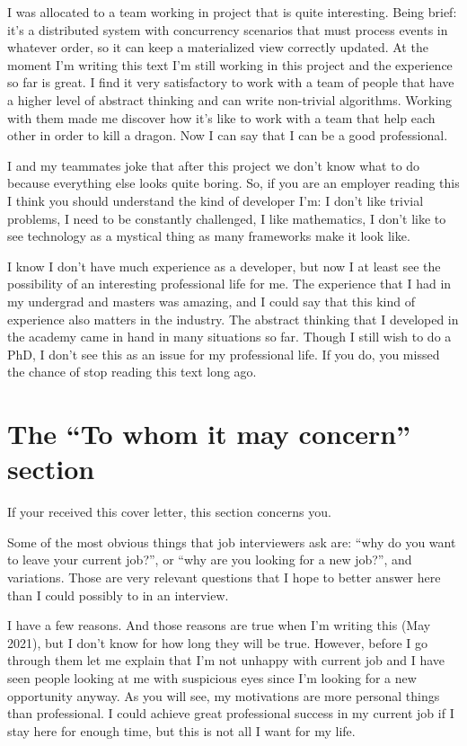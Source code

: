 \documentclass[11pt,a4paper,sans]{moderncv}
\begin{document}
\medskip

I was allocated to a team working in project that is quite interesting.
Being brief: it's a distributed system with concurrency scenarios that must process events in whatever order, so it can keep a materialized view correctly updated.
At the moment I'm writing this text I'm still working in this project and the experience so far is great.
I find it very satisfactory to work with a team of people that have a higher level of abstract thinking and can write non-trivial algorithms.
Working with them made me discover how it's like to work with a team that help each other in order to kill a dragon.
Now I can say that I can be a good professional.

\medskip

I and my teammates joke that after this project we don't know what to do because everything else looks quite boring.
So, if you are an employer reading this I think you should understand the kind of developer I'm:
I don't like trivial problems, I need to be constantly challenged, I like mathematics, I don't like to see technology as a mystical thing as many frameworks make it look like.

\medskip

I know I don't have much experience as a developer, but now I at least see the possibility of an interesting professional life for me.
The experience that I had in my undergrad and masters was amazing, and I could say that this kind of experience also matters in the industry.
The abstract thinking that I developed in the academy came in hand in many situations so far.
Though I still wish to do a PhD, I don't see this as an issue for my professional life.
If you do, you missed the chance of stop reading this text long ago.

\section{The ``To whom it may concern'' section}
If your received this cover letter, this section concerns you.

\medskip

Some of the most obvious things that job interviewers ask are:
``why do you want to leave your current job?'', or
``why are you looking for a new job?'', and variations.
Those are very relevant questions that I hope to better answer here than I could possibly to in an interview.

\medskip

I have a few reasons.
And those reasons are true when I'm writing this (May 2021), but I don't know for how long they will be true.
However, before I go through them let me explain that I'm not unhappy with current job and I have seen people looking at me with suspicious eyes since I'm looking for a new opportunity anyway.
As you will see, my motivations are more personal things than professional.
I could achieve great professional success in my current job if I stay here for enough time, but this is not all I want for my life.
\end{document}
